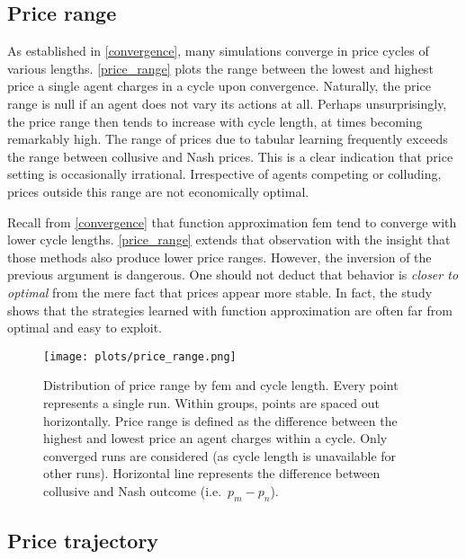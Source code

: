 \subsection{Price range}\label{prices}

As established in \autoref{convergence}, many simulations converge in price cycles of various lengths. \autoref{price_range} plots the range between the lowest and highest price a single agent charges in a cycle upon convergence. Naturally, the price range is null if an agent does not vary its actions at all. Perhaps unsurprisingly, the price range then tends to increase with cycle length, at times becoming remarkably high. The range of prices due to tabular learning frequently exceeds the range between collusive and Nash prices. This is a clear indication that price setting is occasionally irrational. Irrespective of agents competing or colluding, prices outside this range are not economically optimal.

Recall from \autoref{convergence} that function approximation \gls{fem} tend to converge with lower cycle lengths. \autoref{price_range} extends that observation with the insight that those methods also produce lower price ranges. However, the inversion of the previous argument is dangerous. One should not deduct that behavior is \emph{closer to optimal} from the mere fact that prices appear more stable. In fact, the study shows that the strategies learned with function approximation are often far from optimal and easy to exploit.

\begin{figure}
	\texttt{[image: plots/price\_range.png]}
	\caption[Distribution of price range by \gls{fem} and cycle length]{Distribution of price range by \gls{fem} and cycle length. Every point represents a single run. Within groups, points are spaced out horizontally. Price range is defined as the difference between the highest and lowest price an agent charges within a cycle. Only converged runs are considered (as cycle length is unavailable for other runs). Horizontal line represents the difference between collusive and Nash outcome (i.e.\ $p_m - p_n$).}
	\label{price_range}
\end{figure}

\clearpage

\subsection{Price trajectory}\label{trajectory_prices_section}

